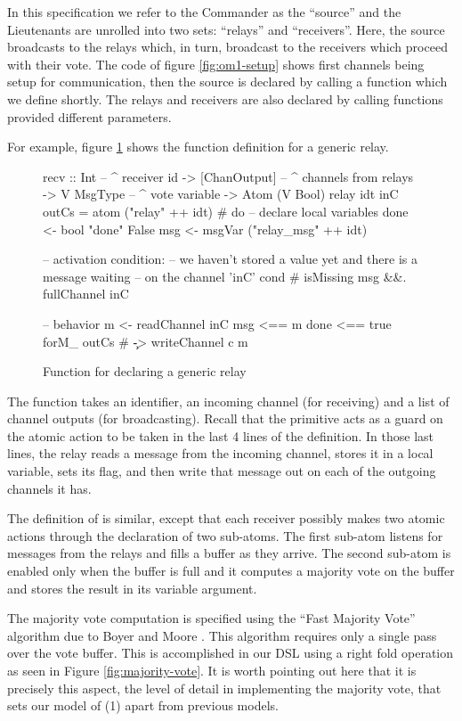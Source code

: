 In this specification we refer to the Commander as the ``source'' and the
Lieutenants are unrolled into two sets: ``relays'' and ``receivers''. Here,
the source broadcasts to the relays which, in turn, broadcast to the
receivers which proceed with their vote. The code of figure
\ref{fig:om1-setup} shows first channels being setup for communication, then
the source is declared by calling a function which we define shortly. The
relays and receivers are also declared by calling functions provided different
parameters.

For example, figure \ref{fig:om1-relay} shows the function definition for a
generic relay.

\begin{figure}
\begin{lima}
recv :: Int           -- ^ receiver id
     -> [ChanOutput]  -- ^ channels from relays
     -> V MsgType     -- ^ vote variable
     -> Atom (V Bool)
relay idt inC outCs = atom ("relay" ++ idt) # do
  -- declare local variables
  done <- bool "done" False
  msg  <- msgVar ("relay_msg" ++ idt)

  -- activation condition:
  --   we haven't stored a value yet and there is a message waiting
  --   on the channel 'inC'
  cond # isMissing msg &&. fullChannel inC

  -- behavior
  m <- readChannel inC
  msg  <== m
  done <== true
  forM_ outCs # \c -> writeChannel c m
\end{lima}
\caption{Function for declaring a generic relay}
\label{fig:om1-relay}
\end{figure}

The  function takes an identifier, an incoming channel (for
receiving) and a list of channel outputs (for broadcasting). Recall that the
 primitive acts as a guard on the atomic action to be taken in the
last 4 lines of the definition. In those last lines, the relay reads a message
from the incoming channel, stores it in a local variable, sets its 
flag, and then write that message out on each of the outgoing channels it has.

The definition of  is similar, except that each receiver possibly makes two
atomic actions through the declaration of two sub-atoms. The first sub-atom
listens for messages from the relays and fills a buffer as they arrive. The
second sub-atom is enabled only when the buffer is full and it computes a
majority vote on the buffer and stores the result in its  variable
argument.

The majority vote computation is specified using the ``Fast Majority Vote''
algorithm due to Boyer and Moore \cite{mjrty}. This algorithm requires only a
single pass over the vote buffer. This is accomplished in our DSL using a
right fold operation as seen in Figure \ref{fig:majority-vote}. It is worth
pointing out here that it is precisely this aspect, the level of detail in
implementing the majority vote, that sets our model of \OM(1) apart from
previous models.

